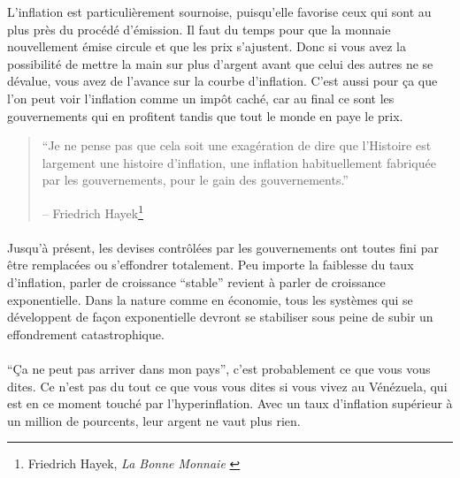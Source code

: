 L'inflation est particulièrement sournoise, puisqu'elle favorise ceux qui sont
au plus près du procédé d'émission. Il faut du temps pour que la monnaie
nouvellement émise circule et que les prix s'ajustent. Donc si vous avez la
possibilité de mettre la main sur plus d'argent avant que celui des autres ne se
dévalue, vous avez de l'avance sur la courbe d'inflation. C'est aussi pour ça
que l'on peut voir l'inflation comme un impôt caché, car au final ce sont les
gouvernements qui en profitent tandis que tout le monde en paye le prix.

\begin{quotation}\begin{samepage}
\enquote{Je ne pense pas que cela soit une exagération de dire que l’Histoire
est largement une histoire d’inflation, une inflation habituellement fabriquée
par les gouvernements, pour le gain des gouvernements.}
\begin{flushright} -- Friedrich Hayek\footnote{Friedrich Hayek, \textit{La Bonne
Monnaie} \cite{hayek-good-money}}
\end{flushright}\end{samepage}\end{quotation}

\paragraph{}
Jusqu'à présent, les devises contrôlées par les gouvernements ont toutes fini
par être remplacées ou s'effondrer totalement. Peu importe la faiblesse du taux
d'inflation, parler de croissance \enquote{stable} revient à parler de
croissance exponentielle. Dans la nature comme en économie, tous les systèmes
qui se développent de façon exponentielle devront se stabiliser sous peine de
subir un effondrement catastrophique.

\paragraph{}
\enquote{Ça ne peut pas arriver dans mon pays}, c'est probablement ce que vous
vous dites. Ce n'est pas du tout ce que vous vous dites si vous vivez au
Vénézuela, qui est en ce moment touché par l'hyperinflation. Avec un taux
d'inflation supérieur à un million de pourcents, leur argent ne vaut plus rien.
\cite{wiki:venezuela}

